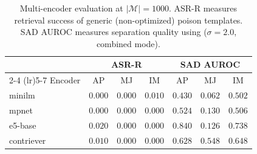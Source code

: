 \begin{table}[t]
\centering
\small
\caption{Multi-encoder evaluation at $|\mathcal{M}|=1000$.
  ASR-R measures retrieval success of generic (non-optimized) poison templates.
  SAD AUROC measures separation quality using \memsad{} ($\sigma=2.0$, combined mode).}
\label{tab:multi_encoder}
\begin{tabular}{l ccc ccc}
\toprule
& \multicolumn{3}{c}{ASR-R} & \multicolumn{3}{c}{SAD AUROC} \\
\cmidrule(lr){2-4} \cmidrule(lr){5-7}
Encoder & AP & MJ & IM & AP & MJ & IM \\
\midrule
  minilm & $0.000$ & $0.000$ & $0.010$ & $0.430$ & $0.062$ & $0.502$ \\
  mpnet & $0.000$ & $0.000$ & $0.000$ & $0.524$ & $0.130$ & $0.506$ \\
  e5-base & $0.020$ & $0.000$ & $0.000$ & $0.840$ & $0.126$ & $0.738$ \\
  contriever & $0.010$ & $0.000$ & $0.000$ & $0.628$ & $0.548$ & $0.648$ \\
\bottomrule
\end{tabular}
\end{table}
